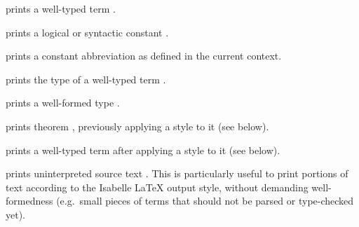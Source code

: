 \begin{isabellebody}
\begin{isamarkuptext}
\begin{descr}
  \item [\isa{{\isachardoublequote}{\isacharat}{\isacharbraceleft}term\ t{\isacharbraceright}{\isachardoublequote}}] prints a well-typed term .

  \item [\isa{{\isachardoublequote}{\isacharat}{\isacharbraceleft}const\ c{\isacharbraceright}{\isachardoublequote}}] prints a logical or syntactic constant
  .
  
  \item [\isa{{\isachardoublequote}{\isacharat}{\isacharbraceleft}abbrev\ c\ x\isactrlsub {\isadigit{1}}\ {\isasymdots}\ x\isactrlsub n{\isacharbraceright}{\isachardoublequote}}] prints a constant
  abbreviation  as defined in
  the current context.

  \item [\isa{{\isachardoublequote}{\isacharat}{\isacharbraceleft}typeof\ t{\isacharbraceright}{\isachardoublequote}}] prints the type of a well-typed term
  .

  \item [\isa{{\isachardoublequote}{\isacharat}{\isacharbraceleft}typ\ {\isasymtau}{\isacharbraceright}{\isachardoublequote}}] prints a well-formed type \isa{{\isachardoublequote}{\isasymtau}{\isachardoublequote}}.
  
  \item [\isa{{\isachardoublequote}{\isacharat}{\isacharbraceleft}thm{\isacharunderscore}style\ s\ a{\isacharbraceright}{\isachardoublequote}}] prints theorem ,
  previously applying a style  to it (see below).
  
  \item [\isa{{\isachardoublequote}{\isacharat}{\isacharbraceleft}term{\isacharunderscore}style\ s\ t{\isacharbraceright}{\isachardoublequote}}] prints a well-typed term  after applying a style  to it (see below).

  \item [\isa{{\isachardoublequote}{\isacharat}{\isacharbraceleft}text\ s{\isacharbraceright}{\isachardoublequote}}] prints uninterpreted source text .  This is particularly useful to print portions of text according
  to the Isabelle {\LaTeX} output style, without demanding
  well-formedness (e.g.\ small pieces of terms that should not be
  parsed or type-checked yet).


\end{descr}
\end{isamarkuptext}
\end{isabellebody}
